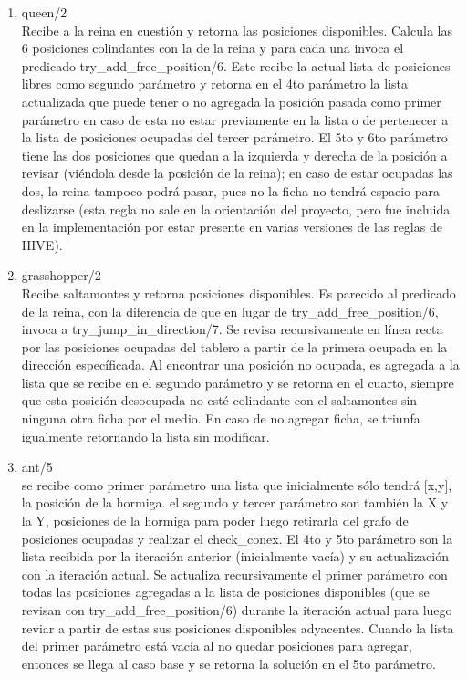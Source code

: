 \documentclass[a4paper,12pt]{article}
\begin{document}
\begin{enumerate}
\item queen/2\\
Recibe a la reina en cuestión y retorna las posiciones disponibles. Calcula las 6 posiciones colindantes con la de la reina y para cada una invoca el predicado try\_add\_free\_position/6. Este recibe la actual lista de posiciones libres como segundo parámetro y retorna en el 4to parámetro la lista actualizada que puede tener o no agregada la posición pasada como primer parámetro en caso de esta no estar previamente en la lista o de pertenecer a la lista de posiciones ocupadas del tercer parámetro. El 5to y 6to parámetro tiene las dos posiciones que quedan a la izquierda y derecha de la posición a revisar (viéndola desde la posición de la reina); en caso de estar ocupadas las dos, la reina tampoco podrá pasar, pues no la ficha no tendrá espacio para deslizarse (esta regla no sale en la orientación del proyecto, pero fue incluida en la implementación por estar presente en varias versiones de las reglas de HIVE).

\item grasshopper/2\\
Recibe saltamontes y retorna posiciones disponibles. Es parecido al predicado de la reina, con la diferencia de que en lugar de try\_add\_free\_position/6, invoca a try\_jump\_in\_direction/7. Se revisa recursivamente en línea recta por las posiciones ocupadas del tablero a partir de la primera ocupada en la dirección específicada. Al encontrar una posición no ocupada, es agregada a la lista que se recibe en el segundo parámetro y se retorna en el cuarto, siempre que esta posición desocupada no esté colindante con el saltamontes sin ninguna otra ficha por el medio. En caso de no agregar ficha, se triunfa igualmente retornando la lista sin modificar.

\item ant/5\\
se recibe como primer parámetro una lista que inicialmente sólo tendrá [x,y], la posición de la hormiga. el segundo y tercer parámetro son también la X y la Y, posiciones de la hormiga para poder luego retirarla del grafo de posiciones ocupadas y realizar el check\_conex. El 4to y 5to parámetro son la lista recibida por la iteración anterior (inicialmente vacía) y su actualización con la iteración actual. Se actualiza recursivamente el primer parámetro con todas las posiciones agregadas a la lista de posiciones disponibles (que se revisan con try\_add\_free\_position/6) durante la iteración actual para luego reviar a partir de estas sus posiciones disponibles adyacentes. Cuando la lista del primer parámetro está vacía al no quedar posiciones para agregar, entonces se llega al caso base y se retorna la solución en el 5to parámetro.


\end{enumerate}
\end{document}
